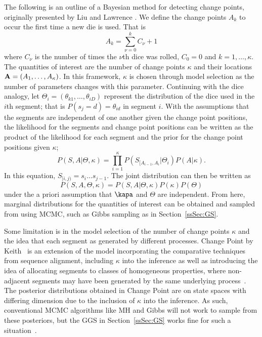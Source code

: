 The following is an outline of a Bayesian method for detecting change points, originally presented by Liu and Lawrence \cite{liu1999bayesian}. We define the change points $A_k$ to occur the first time a new die is used. That is
    \begin{equation}
        A_k = \sum_{\nu=0}^{k}C_\nu + 1
    \end{equation}
where $C_\nu$ is the number of times the $\nu$th dice was rolled, $C_0 = 0$ and $k = 1,\ldots,\kappa$. The quantities of interest are the number of change points $\kappa$ and their locations $\mathbf{A} = (A_1,\ldots,A_\kappa)$. In this framework, $\kappa$ is chosen through model selection as the number of parameters changes with this parameter. Continuing with the dice analogy, let $\Theta_i = (\theta_{k1},\ldots,\theta_{iD})$ represent the distribution of the dice used in the $i$th segment; that is $P(s_j = d) = \theta_{id}$ in segment $i$. With the assumptions that the segments are independent of one another given the change point positions, the likelihood for the segments and change point positions can be written as the product of the likelihood for each segment and the prior for the change point positions given $\kappa$;
    \begin{equation}
        P(S,A|\Theta, \kappa) = \prod_{i=1}^{\kappa} P(S_{[A_{i-1},A_{i}}|\Theta_i)P(A|\kappa).
    \end{equation}
In this equation, $S_{[i,j)} = s_i\ldots s_{j-1}$. The joint distribution can then be written as
    \begin{equation}
        P(S,A,\Theta,\kappa) =  P(S,A|\Theta, \kappa)P(\kappa)P(\Theta)
    \end{equation}
under the a priori assumption that $\kapa$ and $\Theta$ are independent. From here, marginal distributions for the quantities of interest can be obtained and sampled from using MCMC, such as Gibbs sampling as in Section~\ref{ssSec:GS}. 

Some limitation is in the model selection of the number of change points $\kappa$ and the idea that each segment as generated by different processes. 
Change Point by Keith~\cite{keith2006segmenting} is an extension of the model incorporating the comparative techniques from sequence alignment, including $\kappa$ into the inference as well as introducing the idea of allocating segments to classes of homogeneous properties, where non-adjacent segments may have been generated by the same underlying process~\cite{oldmeadow2009multiple}. The posterior distributions obtained in Change Point are on state spaces with differing dimension due to the inclusion of $\kappa$ into the inference. As such, conventional MCMC algorithms like MH and Gibbs will not work to sample from these posteriors, but the GGS in Section~\ref{ssSec:GS} works fine for such a situation~\cite{keith2004generalized}.


